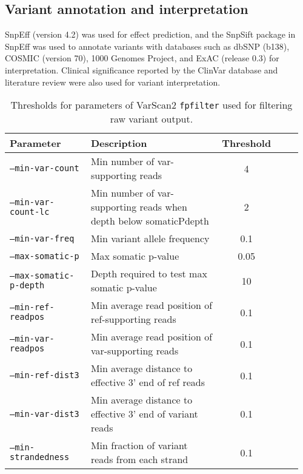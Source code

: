 \subsection{Variant annotation and interpretation}

SnpEff (version 4.2) was used for effect prediction, and the SnpSift package in SnpEff was used to annotate variants with databases such as dbSNP (b138), COSMIC (version 70), 1000 Genomes Project, and ExAC (release 0.3) for interpretation. Clinical significance reported by the ClinVar database and literature review were also used for variant interpretation.


\begin{table}[H]
\caption{Thresholds for parameters of VarScan2 \texttt{fpfilter} used for filtering raw variant output.}
\label{tbl:varscan_fpfilter_parameters}
\centering
      \begin{tabular}{p{0.3\linewidth}p{0.56\linewidth}cp{0.1\linewidth}}
        \hline
        Parameter & Description & Threshold
				\\
				\hline
				\texttt{--min-var-count} & Min number of var-supporting reads & 4
				\\
        \texttt{--min-var-count-lc} & Min number of var-supporting reads when depth below somaticPdepth & 2
        \\
        \texttt{--min-var-freq} & Min variant allele frequency & 0.1
				\\
        \texttt{--max-somatic-p} & Max somatic p-value & 0.05
				\\
        \texttt{--max-somatic-p-depth} & Depth required to test max somatic p-value & 10
				\\
        \texttt{--min-ref-readpos} & Min average read position of ref-supporting reads & 0.1
				\\
        \texttt{--min-var-readpos} & Min average read position of var-supporting reads & 0.1
				\\
        \texttt{--min-ref-dist3} & Min average distance to effective 3' end of ref reads & 0.1
				\\
        \texttt{--min-var-dist3} & Min average distance to effective 3' end of variant reads & 0.1
				\\
        \texttt{--min-strandedness} & Min fraction of variant reads from each strand & 0.1
				\\

\end{tabular}
\end{table}
